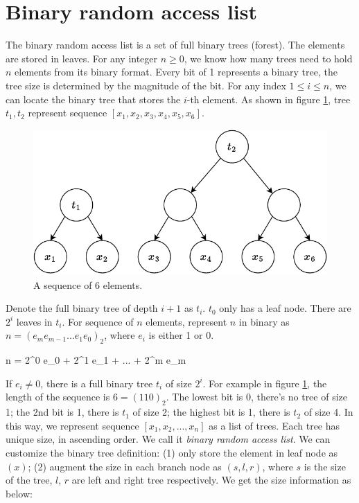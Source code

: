 \documentclass[b5paper]{article}
\begin{document}
\section{Binary random access list}

The binary random access list is a set of full binary trees (forest). The elements are stored in leaves. For any integer $n \geq 0$, we know how many trees need to hold $n$ elements from its binary format. Every bit of 1 represents a binary tree, the tree size is determined by the magnitude of the bit. For any index $1 \leq i \leq n$, we can locate the binary tree that stores the $i$-th element. As shown in figure \ref{fig:bi-tree-sequence}, tree $t_1, t_2$ represent sequence $[x_1, x_2, x_3, x_4, x_5, x_6]$.

\begin{figure}[htbp]
  \centering
  \includegraphics[scale=0.5]{img/bi-tree-sequence}
  \caption{A sequence of 6 elements.}
  \label{fig:bi-tree-sequence}
\end{figure}

Denote the full binary tree of depth $i + 1$ as $t_i$. $t_0$ only has a leaf node. There are $2^i$ leaves in $t_i$. For sequence of $n$ elements, represent $n$ in binary as $n = (e_m e_{m-1} ... e_1 e_0)_2$, where $e_i$ is either 1 or 0.

\be
n = 2^0 e_0 + 2^1 e_1 + ... + 2^m e_m
\ee

If $e_i \neq 0$, there is a full binary tree $t_i$ of size $2^i$. For example in figure \ref{fig:bi-tree-sequence}, the length of the sequence is $6 = (110)_2$. The lowest bit is 0, there's no tree of size 1; the 2nd bit is 1, there is $t_1$ of size 2; the highest bit is 1, there is $t_2$ of size 4. In this way, we represent sequence $[x_1, x_2, ..., x_n]$ as a list of trees. Each tree has unique size, in ascending order. We call it {\em binary random access list}\cite{okasaki-book}. We can customize the binary tree definition: (1) only store the element in leaf node as $(x)$; (2) augment the size in each branch node as $(s, l, r)$, where $s$ is the size of the tree, $l$, $r$ are left and right tree respectively. We get the size information as below:
\end{document}
